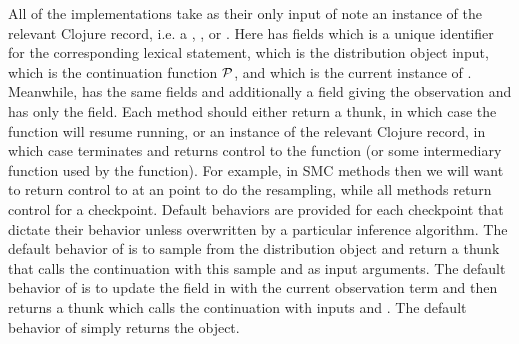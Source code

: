 All of the \checkpoint implementations
take as their only input of note an instance of the relevant Clojure record, i.e. a
 , , or .  
 Here  has
fields  which is a unique identifier for the corresponding lexical \sample statement, 
which is the distribution object input,  which is the continuation function $\mathcal{P}$, and 
which is the current instance of \angstate.  Meanwhile,  has the same fields and additionally
a  field giving the observation and  has only the  field.  Each
\checkpoint method should either return a thunk, in which case the  function will resume running,
or an instance of the relevant Clojure record, in which case  terminates and returns control to the \anginfer
function (or some intermediary function used by the \anginfer function).  For example, in SMC methods
then we will want to return control to \anginfer at an \observe point to do the resampling, while all methods
return control for a  checkpoint.
Default behaviors are provided for each checkpoint that dictate their behavior unless overwritten by
a particular inference algorithm.  The default behavior of \sample is to sample from the distribution
object and return a thunk that calls the continuation with this sample and \angstate as input arguments.
The default behavior of \observe is to update the  field in \angstate with the current
observation term and then returns a thunk which calls the continuation with inputs  and \angstate.  The default behavior
of  simply returns the  object.